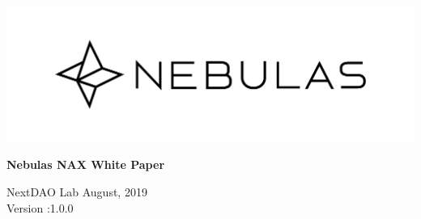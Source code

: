\documentclass[12pt]{article}
\begin{document}
\pagestyle{empty}
\renewcommand{\contentsname}{catalog}
\renewcommand{\abstractname}{Abstract}
\renewcommand{\refname}{References}
\renewcommand{\figurename}{Figure}
\renewcommand{\tablename}{Table}
\renewcommand{\baselinestretch}{1.5}
\renewcommand{\appendixname}{Appendix}
\renewcommand{\proofname}{proof}


\begin{titlepage}
  \begin{center}
    \vspace*{5.5cm}
    \includegraphics[scale=0.4]{../common/Nebulas.png}
    \vspace{0.5cm}


    \textbf{\huge{Nebulas NAX White Paper}}

    \vspace{0.5cm}
    NextDAO Lab 
    \vfill
    August, 2019 \\
    Version :1.0.0
    \textbf{}
  \end{center}

\end{titlepage}
\setcounter{page}{0}
\tableofcontents
\newpage
\setcounter{page}{1}
\pagestyle{fancy}
\vspace*{0.01cm}





\newpage


\newpage 
\begin{appendices}

%

\end{appendices}
\end{document}
